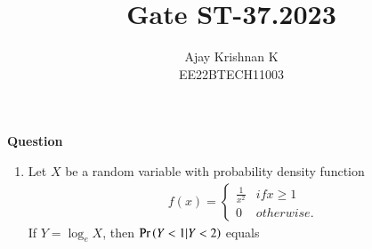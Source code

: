 \documentclass[journal,11pt]{IEEEtran}
\begin{document}
\vspace{3cm}
\author{Ajay Krishnan K\\EE22BTECH11003}

\title{Gate ST-37.2023}
\maketitle

\textbf{Question}
\begin{enumerate}
    \item Let $X$ be a random variable with probability density function
          \begin{align}\
              f(x) = \begin{cases}
                         \frac{1}{x^2} & if x \geq 1 \\
                         0             & otherwise.
                     \end{cases}
          \end{align}
          If $Y = \log_e X$, then $\Pr\left(Y<1 | Y<2 \right)$ equals



\end{enumerate}
\end{document}
